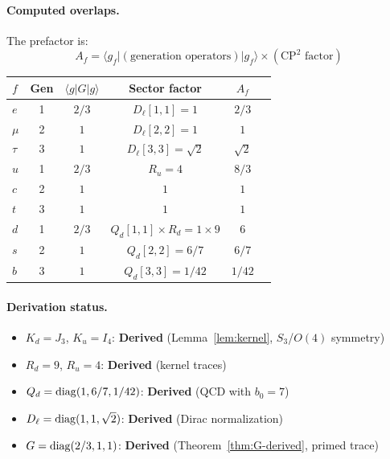 \paragraph{Computed overlaps.}
The prefactor is:
\begin{equation}
A_f = \langle g_f | (\text{generation operators}) | g_f \rangle \times (\text{CP}^2 \text{ factor})
\end{equation}

\begin{center}
\begin{tabular}{lccccc}
\toprule
$f$ & Gen & $\langle g|G|g\rangle$ & Sector factor & $A_f$ \\
\midrule
$e$ & 1 & $2/3$ & $D_\ell[1,1] = 1$ & $2/3$ \\
$\mu$ & 2 & $1$ & $D_\ell[2,2] = 1$ & $1$ \\
$\tau$ & 3 & $1$ & $D_\ell[3,3] = \sqrt{2}$ & $\sqrt{2}$ \\
$u$ & 1 & $2/3$ & $R_u = 4$ & $8/3$ \\
$c$ & 2 & $1$ & $1$ & $1$ \\
$t$ & 3 & $1$ & $1$ & $1$ \\
$d$ & 1 & $2/3$ & $Q_d[1,1] \times R_d = 1 \times 9$ & $6$ \\
$s$ & 2 & $1$ & $Q_d[2,2] = 6/7$ & $6/7$ \\
$b$ & 3 & $1$ & $Q_d[3,3] = 1/42$ & $1/42$ \\
\bottomrule
\end{tabular}
\end{center}

\paragraph{Derivation status.}
\begin{itemize}[nosep]
\item $K_d = J_3$, $K_u = I_4$: \textbf{Derived} (Lemma~\ref{lem:kernel}, $S_3$/$O(4)$ symmetry)
\item $R_d = 9$, $R_u = 4$: \textbf{Derived} (kernel traces)
\item $Q_d = {\rm diag}(1, 6/7, 1/42)$: \textbf{Derived} (QCD with $b_0 = 7$)
\item $D_\ell = {\rm diag}(1, 1, \sqrt{2})$: \textbf{Derived} (Dirac normalization)
\item $G = {\rm diag}(2/3, 1, 1)$: \textbf{Derived} (Theorem~\ref{thm:G-derived}, primed trace)
\end{itemize}

